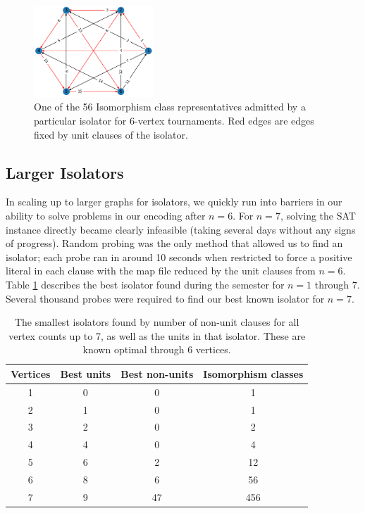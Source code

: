 \documentclass[a4paper,UKenglish,cleveref, autoref, thm-restate]{lipics-v2021}
\begin{document}
\begin{figure}
\includegraphics[width=0.4\textwidth]{iso6.png}
\caption{One of the 56 Isomorphism class representatives admitted by a particular isolator for 6-vertex tournaments. Red edges are edges fixed by unit clauses of the isolator.} \label{fig3}
\end{figure}

\subsection{Larger Isolators}

In scaling up to larger graphs for isolators, we quickly run into barriers in our ability to solve problems in our encoding after $n = 6$.  For $n = 7$, solving the SAT instance directly became clearly infeasible (taking several days without any signs of progress). Random probing was the only method that allowed us to find an isolator; each probe ran in around 10 seconds when restricted to force a positive literal in each clause with the map file reduced by the unit clauses from $n=6$.  Table \ref{tab:smallest_isolators_found} describes the best isolator found during the semester for $n = 1$ through $7$. Several thousand probes were required to find our best known isolator for $n=7$.

\begin{table}[ht]
    \centering
    \begin{tabular}{c|c|c|c}
        Vertices &Best units & Best non-units & Isomorphism classes \\ \hline
        1&0&0&1\\ 
        2&1&0&1\\ 
        3&2&0&2\\ 
        4&4&0&4\\
        5&6&2&12\\ 
        6&8&6&56\\ 
        7&9&47&456\\ 
    \end{tabular}
    \caption{The smallest isolators found by number of non-unit clauses for all vertex counts up to 7, as well as the units in that isolator.  These are known optimal through 6 vertices.}
    \label{tab:smallest_isolators_found}
\end{table}
\end{document}
